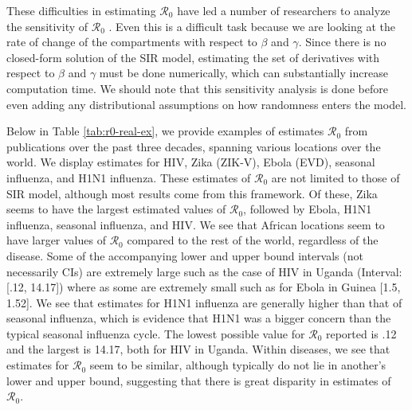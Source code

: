 \message{ !name(draft_v13.tex)}\documentclass[12pt]{article}
\newcommand{\rr}{\ensuremath{\mathcal{R}_0}}
\begin{document}
These difficulties in estimating $\rr$ have led a number of researchers to analyze the sensitivity of $\rr$ \citep{lash2003,epstein2007agent,capaldi2012}.  Even this is a difficult task because we are looking at the rate of change of the compartments with respect to $\beta$ and $\gamma$.  Since there is no closed-form solution of the SIR model, estimating the set of derivatives with respect to $\beta$ and $\gamma$ must be done numerically, which can substantially increase computation time.  We should note that this sensitivity analysis is done before even adding any distributional assumptions on how randomness enters the model.

Below in Table \ref{tab:r0-real-ex}, we provide examples of estimates $\rr$ from publications over the past three decades, spanning various locations over the world.  We display estimates for HIV, Zika (ZIK-V), Ebola (EVD), seasonal influenza, and H1N1 influenza.  These estimates of $\rr$ are not limited to those of SIR model, although most results come from this framework.  Of these, Zika seems to have the largest estimated values of $\rr$, followed by Ebola, H1N1 influenza, seasonal influenza, and HIV.  We see that African locations seem to have larger values of $\rr$ compared to the rest of the world, regardless of the disease.  Some of the accompanying lower and upper bound intervals (not necessarily CIs) are extremely large such as the case of HIV in Uganda (Interval: [.12, 14.17]) where as some are extremely small such as for Ebola in Guinea [1.5, 1.52].  We see that estimates for H1N1 influenza are generally higher than that of seasonal influenza, which is evidence that H1N1 was a bigger concern than the typical seasonal influenza cycle.  The lowest possible value for $\rr$ reported is .12 and the largest is 14.17, both for HIV in Uganda.  Within diseases, we see that estimates for $\rr$ seem to be similar, although typically do not lie in another's lower and upper bound, suggesting that there is great disparity in estimates of $\rr$.
\end{document}
